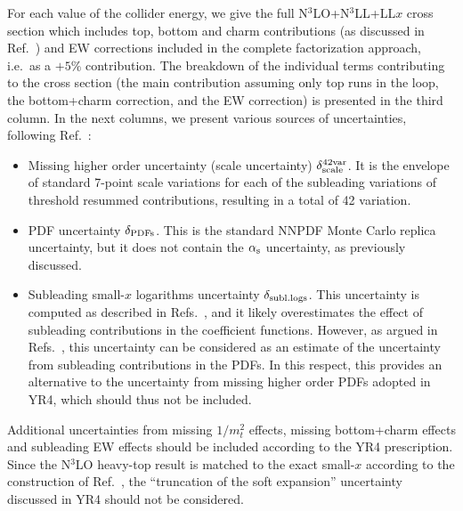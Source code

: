 For each value of the collider energy, we give the full
N$^3$LO+N$^3$LL+LL$x$ cross section which includes top, bottom and
charm contributions (as discussed in Ref.~\cite{Bonvini:2018iwt}) and
EW corrections included in the complete factorization approach, i.e.\
as a $+5\%$ contribution.  The breakdown of the individual terms
contributing to the cross section (the main contribution assuming only
top runs in the loop, the bottom+charm correction, and the EW
correction) is presented in the third column.  In the next columns, we
present various sources of uncertainties,
following Ref.~\cite{Bonvini:2018ixe}:
\begin{itemize}
\item Missing higher order uncertainty (scale uncertainty)
  $\delta_{\rm scale}^{\rm 42var}$. It is the envelope of standard
  7-point scale variations for each of the subleading variations of
  threshold resummed contributions, resulting in a total of 42
  variation.

\item PDF uncertainty $\delta_{\rm PDFs}$. This is the standard NNPDF
  Monte Carlo replica uncertainty, but it does not contain the $\alpha_\text{s}$
  uncertainty, as previously discussed.

\item Subleading small-$x$ logarithms uncertainty
  $\delta_{\rm subl.logs}$. This uncertainty is computed as described
  in Refs.~\cite{Bonvini:2018ixe,Bonvini:2018iwt}, and it likely
  overestimates the effect of subleading contributions in the
  coefficient functions. However, as argued in
  Refs.~\cite{Bonvini:2018ixe,Bonvini:2018iwt}, this uncertainty can
  be considered as an estimate of the uncertainty from subleading
  contributions in the PDFs. In this respect, this provides an
  alternative to the uncertainty from missing higher order PDFs
  adopted in YR4, which should thus not be included.
\end{itemize}
Additional uncertainties from missing $1/m_t^2$ effects, missing
bottom+charm effects and subleading EW effects should be included
according to the YR4 prescription.  Since the N$^3$LO heavy-top result
is matched to the exact small-$x$ according to the construction of
Ref.~\cite{Bonvini:2018iwt}, the ``truncation of the soft expansion''
uncertainty discussed in YR4 should not be considered.

